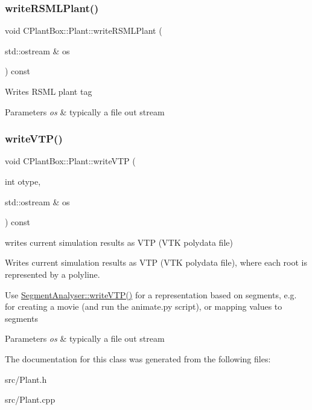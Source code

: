 \subsubsection{\texorpdfstring{write\+R\+S\+M\+L\+Plant()}{writeRSMLPlant()}}
{\footnotesize\ttfamily void C\+Plant\+Box\+::\+Plant\+::write\+R\+S\+M\+L\+Plant (\begin{DoxyParamCaption}\item[{std\+::ostream \&}]{os }\end{DoxyParamCaption}) const\hspace{0.3cm}{\ttfamily [protected]}}

Writes R\+S\+ML plant tag


\begin{DoxyParams}{Parameters}
{\em os} & typically a file out stream \\
\hline
\end{DoxyParams}
\mbox{\label{classCPlantBox_1_1Plant_a9c6a8fae2215911ab0b7cebd8355128e}} 
\subsubsection{\texorpdfstring{write\+V\+T\+P()}{writeVTP()}}
{\footnotesize\ttfamily void C\+Plant\+Box\+::\+Plant\+::write\+V\+TP (\begin{DoxyParamCaption}\item[{int}]{otype,  }\item[{std\+::ostream \&}]{os }\end{DoxyParamCaption}) const}



writes current simulation results as V\+TP (V\+TK polydata file) 

Writes current simulation results as V\+TP (V\+TK polydata file), where each root is represented by a polyline.

Use \hyperlink{classCPlantBox_1_1SegmentAnalyser_a491635f641d9f9ce71bf3efee352ff66}{Segment\+Analyser\+::write\+V\+T\+P()} for a representation based on segments, e.\+g. for creating a movie (and run the animate.\+py script), or mapping values to segments


\begin{DoxyParams}{Parameters}
{\em os} & typically a file out stream \\
\hline
\end{DoxyParams}


The documentation for this class was generated from the following files\+:\begin{DoxyCompactItemize}
\item 
src/Plant.\+h\item 
src/Plant.\+cpp\end{DoxyCompactItemize}
